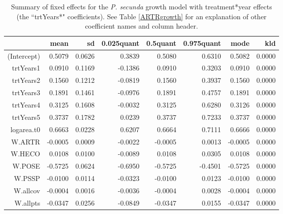 \documentclass[11pt]{article}
\begin{document}
\begin{table}
\centering
\caption{Summary of fixed effects for the \textit{P. secunda} growth model with treatment*year effects (the ``trtYears*" coefficients). See Table \ref{ARTRgrowth} for an explanation of other coefficient names and column header.} 
\label{table:POSEgrowth-trtYears}
\begin{tabular}{rrrrrrrr}
  \hline
 & mean & sd & 0.025quant & 0.5quant & 0.975quant & mode & kld \\ 
  \hline
(Intercept) & 0.5079 & 0.0626 & 0.3839 & 0.5080 & 0.6310 & 0.5082 & 0.0000 \\ 
  trtYears1 & 0.0910 & 0.1169 & -0.1386 & 0.0910 & 0.3203 & 0.0910 & 0.0000 \\ 
  trtYears2 & 0.1560 & 0.1212 & -0.0819 & 0.1560 & 0.3937 & 0.1560 & 0.0000 \\ 
  trtYears3 & 0.1891 & 0.1461 & -0.0976 & 0.1891 & 0.4757 & 0.1891 & 0.0000 \\ 
  trtYears4 & 0.3125 & 0.1608 & -0.0032 & 0.3125 & 0.6280 & 0.3126 & 0.0000 \\ 
  trtYears5 & 0.3737 & 0.1782 & 0.0239 & 0.3737 & 0.7233 & 0.3737 & 0.0000 \\ 
  logarea.t0 & 0.6663 & 0.0228 & 0.6207 & 0.6664 & 0.7111 & 0.6666 & 0.0000 \\ 
  W.ARTR & -0.0005 & 0.0009 & -0.0022 & -0.0005 & 0.0013 & -0.0005 & 0.0000 \\ 
  W.HECO & 0.0108 & 0.0100 & -0.0089 & 0.0108 & 0.0305 & 0.0108 & 0.0000 \\ 
  W.POSE & -0.5725 & 0.0624 & -0.6950 & -0.5725 & -0.4501 & -0.5725 & 0.0000 \\ 
  W.PSSP & -0.0100 & 0.0114 & -0.0323 & -0.0100 & 0.0123 & -0.0100 & 0.0000 \\ 
  W.allcov & -0.0004 & 0.0016 & -0.0036 & -0.0004 & 0.0028 & -0.0004 & 0.0000 \\ 
  W.allpts & -0.0347 & 0.0256 & -0.0849 & -0.0347 & 0.0155 & -0.0347 & 0.0000 \\ 
   \hline
\end{tabular}
\end{table}
\end{document}
